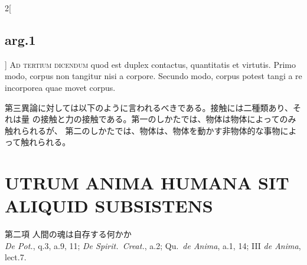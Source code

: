 \documentclass[paper=a4paper,fontsize=10pt,jafontsize=9pt,titlepage]{jlreq}
\begin{document}
\begin{paracol}{2}[\subsection{arg.1}]
 {\scshape Ad tertium dicendum} quod est duplex contactus, quantitatis et
 virtutis. Primo modo, corpus non tangitur nisi a corpore. Secundo
 modo, corpus potest tangi a re incorporea quae movet corpus.

\switchcolumn

 第三異論に対しては以下のように言われるべきである。接触には二種類あり、それは量
 の接触と力の接触である。第一のしかたでは、物体は物体によってのみ触れられるが、
 第二のしかたでは、物体は、物体を動かす非物体的な事物によって触れられる。

\switchcolumn

\end{paracol}
\newpage

\section{UTRUM ANIMA HUMANA SIT ALIQUID SUBSISTENS}
{\Large 第二項 人間の魂は自存する何かか}\\
{\footnotesize {\itshape De Pot.}, q.3, a.9, 11; {\itshape De
 Spirit.~Creat.}, a.2; Qu.~{\itshape de Anima}, a.1, 14; III {\itshape
 de Anima}, lect.7.}
\end{document}
